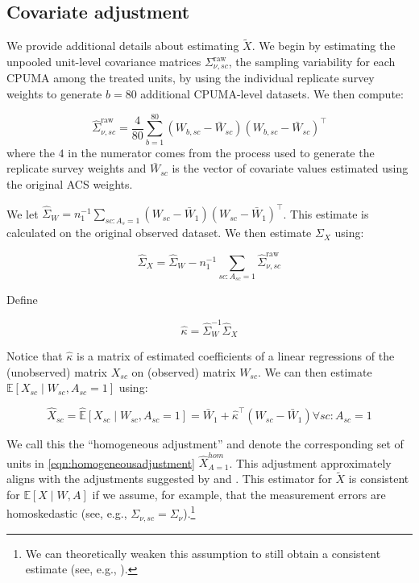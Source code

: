 \subsection{Covariate adjustment}

We provide additional details about estimating $\tilde{X}$. We begin by estimating the unpooled unit-level covariance matrices $\Sigma_{\nu, sc}^{\text{raw}}$, the sampling variability for each CPUMA among the treated units, by using the individual replicate survey weights to generate $b = 80$ additional CPUMA-level datasets. We then compute:

\begin{equation}
\hat{\Sigma}_{\nu, sc}^{\text{raw}} = \frac{4}{80}\sum_{b=1}^{80}(W_{b, sc} - \bar{W}_{sc})(W_{b, sc} - \bar{W}_{sc})^\top
\end{equation}
%
where the $4$ in the numerator comes from the process used to generate the replicate survey weights and $\bar{W}_{sc}$ is the vector of covariate values estimated using the original ACS weights.

We let $\hat{\Sigma}_{W} = n_1^{-1}\sum_{sc: A_s = 1} (W_{sc} - \bar{W}_1)(W_{sc} - \bar{W}_1)^\top$. This estimate is calculated on the original observed dataset. We then estimate $\Sigma_{X}$ using:

\begin{equation}
\hat{\Sigma}_X = \hat{\Sigma}_W - n_1^{-1}\sum_{sc: A_{sc} = 1} \hat{\Sigma}_{\nu, sc}^{\text{raw}}
\end{equation}

Define

\begin{equation}
\hat{\kappa} = \hat{\Sigma}_W^{-1}\hat{\Sigma}_X
\end{equation}

Notice that $\hat{\kappa}$ is a matrix of estimated coefficients of a linear regressions of the (unobserved) matrix $X_{sc}$ on (observed) matrix $W_{sc}$. We can then estimate $\mathbb{E}[X_{sc} \mid W_{sc}, A_{sc} = 1]$ using: 

\begin{equation}\label{eqn:homogeneousadjustment}
\hat{X}_{sc} = \hat{\mathbb{E}}[X_{sc} \mid W_{sc}, A_{sc} = 1] = \bar{W}_1 + \hat{\kappa}^\top(W_{sc} - \bar{W}_1) \forall sc: A_{sc} = 1
\end{equation}

We call this the ``homogeneous adjustment'' and denote the corresponding set of units in \eqref{eqn:homogeneousadjustment} $\hat{X}_{A=1}^{hom}$. This adjustment approximately aligns with the adjustments suggested by \cite{carroll2006measurement} and \cite{gleser1992importance}. This estimator for $\tilde{X}$ is consistent for $\mathbb{E}[X \mid W, A]$ if we assume, for example, that the measurement errors are homoskedastic (see, e.g., $\Sigma_{\nu, sc} = \Sigma_{\nu}$).\footnote{We can theoretically weaken this assumption to still obtain a consistent estimate (see, e.g., \cite{buonaccorsi2010measurement}).}

